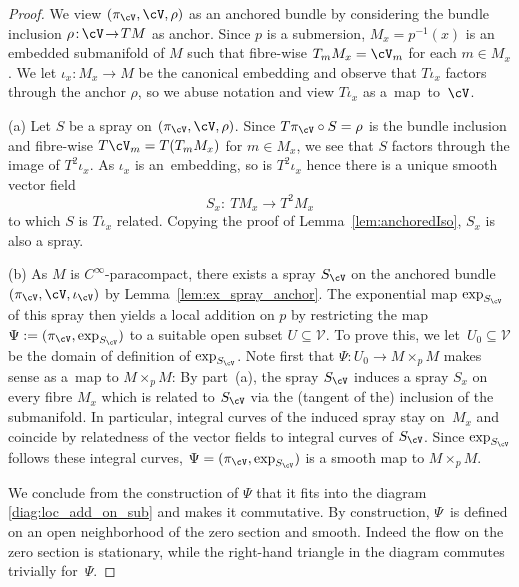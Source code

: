 \begin{proof} We view $(\pi_{\cV},\cV,\rho)$ as an anchored bundle by considering the bundle inclusion ${\rho \colon\! \cV \!\rightarrow\! TM}$ as anchor. Since $p$ is a submersion, $M_x= p^{-1}(x)$ is an embedded submanifold of $M$ such that fibre-wise $T_m M_x = \cV_m$ for each $m \in M_x$. We let $\iota_x \colon M_x \rightarrow M$ be the canonical embedding and observe that $T\iota_x$ factors through the anchor $\rho$, so we abuse notation and view $T\iota_x$ as a~map~to~$\cV$.

(a) Let $S$ be a spray on $(\pi_\cV, \cV, \rho)$. Since $T\pi_\cV \circ S = \rho$ is the bundle inclusion and fibre-wise $T\cV_m = T(T_m M_x)$ for $m \in M_x$, we see that $S$ factors through the image of $T^2 \iota_x$.
As $\iota_x$ is an~embedding, so is $T^2\iota_x$ hence there is a unique smooth vector field
\begin{displaymath}S_x \colon\ T M_x \rightarrow T^2M_x\end{displaymath}
to which $S$ is $T\iota_x$ related. Copying the proof of Lemma~\ref{lem:anchoredIso}, $S_x$ is also a spray.

(b) As $M$ is $C^\infty$-paracompact, there exists a spray $S_\cV$ on the anchored bundle $(\pi_\cV,\cV,\iota_{\cV})$ by Lemma~\ref{lem:ex_spray_anchor}.
The exponential map $\exp_{S_\cV}$ of this spray then yields a local addition on $p$ by restricting the map $\Psi := (\pi_{\cV}, \exp_{S_\cV})$ to a suitable open subset $U \subseteq \mathcal{V}$. To prove this, we let~${U_{0} \subseteq \mathcal{V}}$ be the domain of definition of $\exp_{S_{\cV}}$.
Note first that $\Psi \colon U_{0} \rightarrow M \times_p M$ makes sense as a~map to $M \times_p M$: By part~(a), the spray $S_\cV$ induces a spray $S_x$ on every fibre $M_x$ which is related to $S_\cV$ via the (tangent of the) inclusion of the submanifold. In particular, integral curves of the induced spray stay on~$M_x$ and coincide by relatedness of the vector fields to integral curves of $S_\cV$. Since $\exp_{S_\cV}$ follows these integral curves, $\Psi= (\pi_{\cV},\exp_{S_\cV})$ is a smooth map to $M\times_p M$.

We conclude from the construction of $\Psi$ that it fits into the diagram \eqref{diag:loc_add_on_sub} and makes it commutative. By construction, $\Psi$~is defined on an open neighborhood of the zero section and smooth. Indeed the flow on the zero section is stationary, while the right-hand triangle in the diagram commutes trivially for~$\Psi$.


\end{proof}
